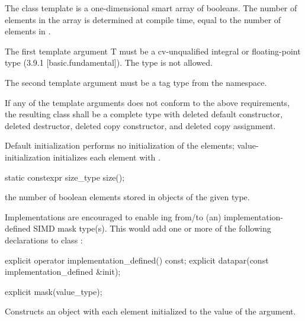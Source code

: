 

\pnum The class template \mask[<T, Abi>] is a one-dimensional smart array of booleans.
The number of elements in the array is determined at compile time, equal to the number of elements in \datapar[<T, Abi>].

\pnum The first template argument \type T must be a cv-unqualified integral or floating-point type (3.9.1 [basic.fundamental]).
The type \bool is not allowed.

\pnum The second template argument  must be a tag type from the  namespace.

\pnum If any of the template arguments does not conform to the above requirements, the resulting class shall be a complete type with deleted default constructor, deleted destructor, deleted copy constructor, and deleted copy assignment.

\pnum Default initialization performs no initialization of the elements; value-initialization initializes each element with .

\begin{itemdecl}
static constexpr size_type size();
\end{itemdecl}
\begin{itemdescr}
  \pnum\returns the number of boolean elements stored in objects of the given \mask[<T, Abi>] type.
\end{itemdescr}

\pnum\realnote Implementations are encouraged to enable ing from/to (an) implementation-defined SIMD mask type(s).
This would add one or more of the following declarations to class \mask:
\begin{itemdecl}
explicit operator implementation_defined() const;
explicit datapar(const implementation_defined &init);
\end{itemdecl}

\begin{itemdecl}
explicit mask(value_type);
\end{itemdecl}
\begin{itemdescr}
  \pnum\effects Constructs an object with each element initialized to the value of the argument.
\end{itemdescr}

